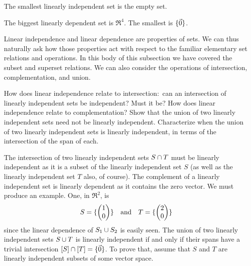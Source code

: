 \begin{exercises}
\begin{answer}
      The smallest linearly independent set is the empty set.

      The biggest linearly dependent set is \( \Re^4 \).
      The smallest is \( \mbox{$\{\vec{0}\}$} \).  
    \end{answer}
  \recommended \item 
    Linear independence and linear dependence are properties of sets.
    We can thus naturally ask how those properties act with respect to
    the familiar elementary set relations and operations.  
    In this body of this subsection we have covered the subset and superset
    relations.
    We can also consider the operations of intersection, complementation, 
    and union.
    \begin{exparts}
       \partsitem How does linear independence relate to intersection:~can
         an intersection of linearly independent sets be independent?
         Must it be?
       \partsitem How does linear independence relate to complementation?
       \partsitem Show that
          the union of two linearly independent sets need not be
          linearly independent.
       \partsitem Characterize when the union of two linearly independent sets
          is linearly independent, in terms of the intersection of the span
          of each.
    \end{exparts}
    \begin{answer}
      \begin{exparts}
        \partsitem The intersection of two linearly independent sets
          $S\cap T$ must be linearly
          independent as it is a subset of the linearly independent set $S$
          (as well as the linearly independent set $T$ also, of course).
        \partsitem The complement of a linearly independent set is linearly
          dependent as it contains the zero vector.
        \partsitem We must produce an example.
          One, in \( \Re^2 \), is
          \begin{equation*}
            S=\mbox{$\{\begin{pmatrix} 1 \\ 0 \end{pmatrix}\}$}
            \quad\text{and}\quad
            T=\mbox{$\{\begin{pmatrix} 2 \\ 0 \end{pmatrix}\}$}
          \end{equation*}
          since the linear dependence of \( S_1\cup S_2 \) is easily seen.
        \partsitem The union of two linearly independent sets $S\cup T$
          is linearly independent if and only if their spans have a trivial 
          intersection $\relax [S\relax ]\cap \relax [T\relax ]=\mbox{$\{\vec{0}\}$}$.
          To prove that, assume that \( S \) and \( T \) are linearly 
          independent subsets of some vector space.


\end{exparts}
\end{answer}
\end{exercises}
